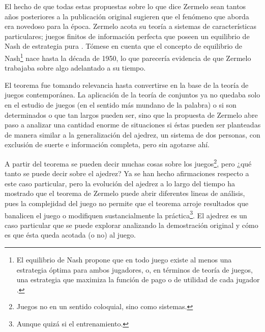 \documentclass[twoside,openright,12pt,a4paper,spanish]{book}
\begin{document}
El hecho de que todas estas propuestas sobre lo que dice Zermelo sean tantos años posteriores a la publicación original sugieren que el fenómeno que aborda era novedoso para la época. Zermelo acota su teoría a sistemas de características particulares; juegos finitos de información perfecta que poseen un equilibrio de Nash de estrategia pura \cite[p. 272]{mas1995microeconomic}. Tómese en cuenta que el concepto de equilibrio de Nash\footnote{El equilibrio de Nash propone que en todo juego existe al menos una estrategia \'optima para ambos jugadores, o, en términos de teoría de juegos, una estrategia que maximiza la función de pago o de utilidad de cada jugador \cite{de2014equilibrio}.} nace hasta la década de 1950, lo que parecería evidencia de que Zermelo trabajaba sobre algo adelantado a su tiempo.

El teorema fue tomando relevancia hasta convertirse en la base de la teoría de juegos contemporánea. La aplicación de la teoría de conjuntos ya no quedaba solo en el estudio de juegos (en el sentido más mundano de la palabra) o si son determinados o que tan largos pueden ser, sino que la propuesta de Zermelo abre paso a analizar una cantidad enorme de situaciones si éstas pueden ser planteadas de manera similar a la generalización del ajedrez, un sistema de dos personas, con exclusión de suerte e información completa, pero sin agotarse ahí.

A partir del teorema se pueden decir muchas cosas sobre los juegos\footnote{Juegos no en un sentido coloquial, sino como sistemas.}, pero ¿qué tanto se puede decir sobre el ajedrez? Ya se han hecho afirmaciones respecto a este caso particular, pero la evolución del ajedrez a lo largo del tiempo ha mostrado que el teorema de Zermelo puede abrir diferentes lineas de análisis, pues la complejidad del juego no permite que el teorema arroje resultados que banalicen el juego o modifiquen sustancialmente la práctica\footnote{Aunque quizá si el entrenamiento.}. El ajedrez es un caso particular que se puede explorar analizando la demostración original y cómo es que ésta queda acotada (o no) al juego.
\end{document}
